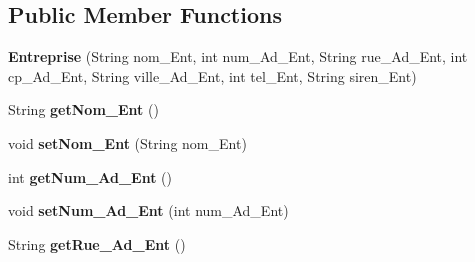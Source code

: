 \subsection*{Public Member Functions}
\begin{DoxyCompactItemize}
\item 
{\bfseries Entreprise} (String nom\+\_\+\+Ent, int num\+\_\+\+Ad\+\_\+\+Ent, String rue\+\_\+\+Ad\+\_\+\+Ent, int cp\+\_\+\+Ad\+\_\+\+Ent, String ville\+\_\+\+Ad\+\_\+\+Ent, int tel\+\_\+\+Ent, String siren\+\_\+\+Ent)\hypertarget{classcom_1_1ecetech_1_1bti4_1_1itproject_1_1classified_1_1beans_1_1_entreprise_a3ec943cd404efd0740de5a4b09f52931}{}\label{classcom_1_1ecetech_1_1bti4_1_1itproject_1_1classified_1_1beans_1_1_entreprise_a3ec943cd404efd0740de5a4b09f52931}

\item 
String {\bfseries get\+Nom\+\_\+\+Ent} ()\hypertarget{classcom_1_1ecetech_1_1bti4_1_1itproject_1_1classified_1_1beans_1_1_entreprise_af37b8b9efaaf7632684f37480bf9f44e}{}\label{classcom_1_1ecetech_1_1bti4_1_1itproject_1_1classified_1_1beans_1_1_entreprise_af37b8b9efaaf7632684f37480bf9f44e}

\item 
void {\bfseries set\+Nom\+\_\+\+Ent} (String nom\+\_\+\+Ent)\hypertarget{classcom_1_1ecetech_1_1bti4_1_1itproject_1_1classified_1_1beans_1_1_entreprise_a9e7b76bd675dcc0512eda1b920e2eae9}{}\label{classcom_1_1ecetech_1_1bti4_1_1itproject_1_1classified_1_1beans_1_1_entreprise_a9e7b76bd675dcc0512eda1b920e2eae9}

\item 
int {\bfseries get\+Num\+\_\+\+Ad\+\_\+\+Ent} ()\hypertarget{classcom_1_1ecetech_1_1bti4_1_1itproject_1_1classified_1_1beans_1_1_entreprise_a309a59d49cf4d85a64befcc4b95db1d2}{}\label{classcom_1_1ecetech_1_1bti4_1_1itproject_1_1classified_1_1beans_1_1_entreprise_a309a59d49cf4d85a64befcc4b95db1d2}

\item 
void {\bfseries set\+Num\+\_\+\+Ad\+\_\+\+Ent} (int num\+\_\+\+Ad\+\_\+\+Ent)\hypertarget{classcom_1_1ecetech_1_1bti4_1_1itproject_1_1classified_1_1beans_1_1_entreprise_a7ffd79c4d0fc8b0e6337e0b71785d0ef}{}\label{classcom_1_1ecetech_1_1bti4_1_1itproject_1_1classified_1_1beans_1_1_entreprise_a7ffd79c4d0fc8b0e6337e0b71785d0ef}

\item 
String {\bfseries get\+Rue\+\_\+\+Ad\+\_\+\+Ent} ()\hypertarget{classcom_1_1ecetech_1_1bti4_1_1itproject_1_1classified_1_1beans_1_1_entreprise_a418160f37dc6e11378c3d1e4a1e45fb7}{}\label{classcom_1_1ecetech_1_1bti4_1_1itproject_1_1classified_1_1beans_1_1_entreprise_a418160f37dc6e11378c3d1e4a1e45fb7}


\end{DoxyCompactItemize}
